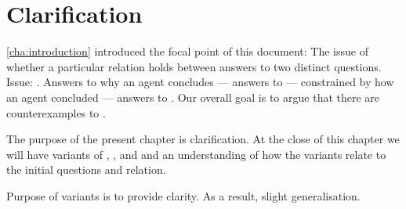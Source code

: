 \chapter{Clarification}
\label{cha:clarification}

\begin{note}
  \autoref{cha:introduction} introduced the focal point of this document:
  The issue of whether a particular relation holds between answers to two distinct questions.
  Issue: \issueInclusion{}.
  Answers to why an agent concludes  --- answers to \qWhy{} --- constrained by how an agent concluded --- answers to \qHow{}.
  Our overall goal is to argue that there are counterexamples to \issueInclusion{}.

  The purpose of the present chapter is clarification.
  At the close of this chapter we will have variants of \qWhy{}, \qHow{}, and \issueInclusion{} and an understanding of how the variants relate to the initial questions and relation.

  Purpose of variants is to provide clarity.
  As a result, slight generalisation.
\end{note}


